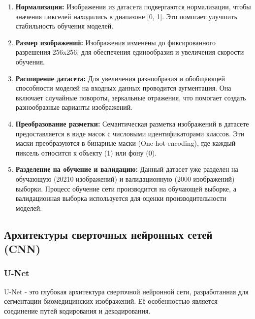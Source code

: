 \documentclass[11pt]{article}
\begin{document}
\begin{enumerate}
\def\labelenumi{\arabic{enumi}.}
\item
  \textbf{Нормализация:} Изображения из датасета подвергаются
  нормализации, чтобы значения пикселей находились в диапазоне {[}0,
  1{]}. Это помогает улучшить стабильность обучения моделей.
\item
  \textbf{Размер изображений:} Изображения изменены до фиксированного
  разрешения 256x256, для обеспечения единообразия и увеличения скорости
  обучения.
\item
  \textbf{Расширение датасета:} Для увеличения разнообразия и обобщающей
  способности моделей на входных данных проводится аугментация. Она
  включает случайные повороты, зеркальные отражения, что помогает
  создать разнообразные варианты изображений.
\item
  \textbf{Преобразование разметки:} Семантическая разметка изображений в
  датасете предоставляется в виде масок с числовыми идентификаторами
  классов. Эти маски преобразуются в бинарные маски (One-hot encoding),
  где каждый пиксель относится к объекту (1) или фону (0).
\item
  \textbf{Разделение на обучение и валидацию:} Данный датасет уже
  разделен на обучающую (20210 изображений) и валидационную (2000
  изображений) выборки. Процесс обучение сети производится на обучающей
  выборке, а валидационная выборка используется для оценки
  производительности моделей.
\end{enumerate}

    \hypertarget{ux430ux440ux445ux438ux442ux435ux43aux442ux443ux440ux44b-ux441ux432ux435ux440ux442ux43eux447ux43dux44bux445-ux43dux435ux439ux440ux43eux43dux43dux44bux445-ux441ux435ux442ux435ux439-cnn}{%
\subsection{Архитектуры сверточных нейронных сетей
(CNN)}\label{ux430ux440ux445ux438ux442ux435ux43aux442ux443ux440ux44b-ux441ux432ux435ux440ux442ux43eux447ux43dux44bux445-ux43dux435ux439ux440ux43eux43dux43dux44bux445-ux441ux435ux442ux435ux439-cnn}}

    \hypertarget{u-net}{%
\subsubsection{U-Net}\label{u-net}}

U-Net - это глубокая архитектура сверточной нейронной сети,
разработанная для сегментации биомедицинских изображений. Её
особенностью является соединение путей кодирования и декодирования.
\end{document}
